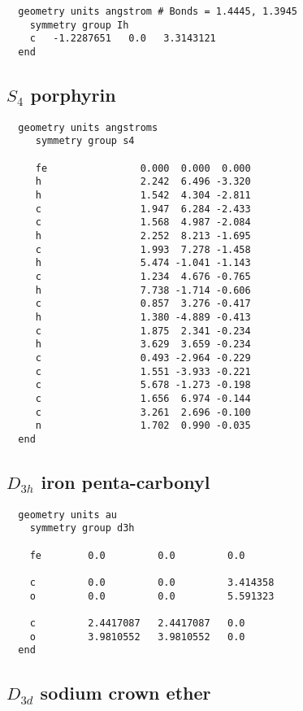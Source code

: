 \begin{verbatim}
  geometry units angstrom # Bonds = 1.4445, 1.3945
    symmetry group Ih
    c   -1.2287651   0.0   3.3143121
  end
\end{verbatim}

  \subsection{\protect$S_4$ porphyrin}

\begin{verbatim}
  geometry units angstroms
     symmetry group s4
  
     fe                0.000  0.000  0.000         
     h                 2.242  6.496 -3.320   
     h                 1.542  4.304 -2.811
     c                 1.947  6.284 -2.433
     c                 1.568  4.987 -2.084
     h                 2.252  8.213 -1.695
     c                 1.993  7.278 -1.458
     h                 5.474 -1.041 -1.143
     c                 1.234  4.676 -0.765
     h                 7.738 -1.714 -0.606
     c                 0.857  3.276 -0.417
     h                 1.380 -4.889 -0.413
     c                 1.875  2.341 -0.234
     h                 3.629  3.659 -0.234
     c                 0.493 -2.964 -0.229
     c                 1.551 -3.933 -0.221
     c                 5.678 -1.273 -0.198
     c                 1.656  6.974 -0.144
     c                 3.261  2.696 -0.100
     n                 1.702  0.990 -0.035
  end
\end{verbatim}

  \subsection{\protect$D_{3h}$ iron penta-carbonyl}

\begin{verbatim}
  geometry units au
    symmetry group d3h

    fe        0.0         0.0         0.0

    c         0.0         0.0         3.414358
    o         0.0         0.0         5.591323

    c         2.4417087   2.4417087   0.0
    o         3.9810552   3.9810552   0.0
  end
\end{verbatim}

  \subsection{\protect$D_{3d}$ sodium crown ether}

